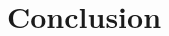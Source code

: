 \section{Conclusion}


\begin{thebibliography}{99}

\end{thebibliography}



\begin{comment}
    \begin{appendices}

      \section{First appendix}

    some text...


Here are simulation programmes we used in our model as follow.\\


\textbf{\textcolor[rgb]{0.98,0.00,0.00}{Input matlab source:}}



      \section{Second appendix}

    some more text\textcolor[rgb]{0.98,0.00,0.00}{\textbf{Input C++ source:}}


    \end{appendices}

\end{comment}